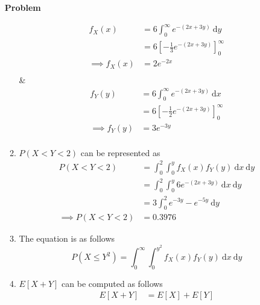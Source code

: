 \documentclass[12pt]{article}
\newenvironment{Ex}{\textbf{Problem}\vspace{.75em}\\}{}
\newcommand{\dd}[1]{\:\mathrm{d}{#1}}
\begin{document}
\begin{enumerate}
\begin{Ex}
\begin{solution}
\begin{enumerate}
\begin{multicols}{2}
          \begin{equation}
            \label{eq:5b-marginal-x}
            \begin{aligned}
              f_X(x) &= 6\int_0^\infty e^{-(2x+3y)} \dd{y} \\
              &= 6\left[-\frac{1}{3}e^{-(2x+3y)}\right]_0^\infty \\
              \implies f_X(x) &= 2e^{-2x} \\
            \end{aligned}
          \end{equation} &
          \begin{equation}
            \label{eq:5b-marginal-y}
            \begin{aligned}
              f_Y(y) &= 6\int_0^\infty e^{-(2x+3y)} \dd{x} \\
              &= 6\left[-\frac{1}{2}e^{-(2x+3y)}\right]_0^\infty \\
              \implies f_Y(y) &= 3e^{-3y} \\
            \end{aligned}
          \end{equation}
        \end{multicols}
      \item $P(X<Y<2)$ can be represented as
        \begin{equation}
          \label{eq:6c-sol}
          \begin{aligned}
            P(X<Y<2) &= \int_0^2\int_0^yf_X(x)f_Y(y)\dd{x}\dd{y} \\
            &=\int_0^2\int_0^y6e^{-(2x+3y)}\dd{x}\dd{y} \\
            &= 3\int_0^2 e^{-3y} - e^{-5y} \dd{y} \\
            \implies P(X<Y<2) &= 0.3976
          \end{aligned}
        \end{equation}
      \item The equation is as follows
        \begin{equation}
          \label{eq:6d-sol}
          P(X\le Y^2) = \int_0^\infty\int_{0}^{y^2}
          f_X(x)f_Y(y)\dd{x}\dd{y}
        \end{equation}
      \item $E[X +Y]$ can be computed as follows
        \begin{equation}
          \label{eq:6e-sol}
          \begin{aligned}
            E[X +Y] &= E[X] + E[Y] \\

\end{aligned}
\end{equation}
\end{enumerate}
\end{solution}
\end{Ex}
\end{enumerate}
\end{document}
